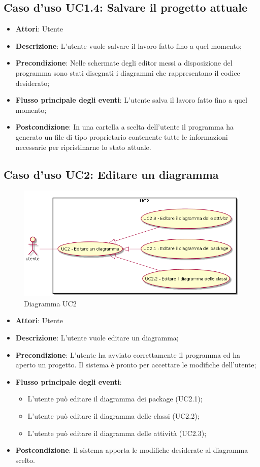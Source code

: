 \documentclass[../AnalisiDeiRequisiti.tex]{subfiles}
\begin{document}
	\subsection{Caso d'uso UC1.4: Salvare il progetto attuale}
	\begin{itemize}
		\item \textbf{Attori}: Utente
		\item \textbf{Descrizione}: L'utente vuole salvare il lavoro fatto fino a quel momento;
		\item \textbf{Precondizione}: Nelle schermate degli editor messi a disposizione del programma sono stati disegnati i diagrammi che rappresentano il codice desiderato;
		\item \textbf{Flusso principale degli eventi}: L'utente salva il lavoro fatto fino a quel momento;
		\item \textbf{Postcondizione}: In una cartella a scelta dell'utente il programma ha generato un file di tipo proprietario contenente tutte le informazioni necessarie per ripristinarne lo stato attuale.
	\end{itemize}
	\subsection{Caso d'uso UC2: Editare un diagramma}
		\begin{figure} [H]
			\centering
			\includegraphics[scale=0.45]{./Figures/UC2.png}
			\caption{Diagramma UC2}\label{}
		\end{figure}
	\begin{itemize}
		\item \textbf{Attori}: Utente
		\item \textbf{Descrizione}: L'utente vuole editare un diagramma;
		\item \textbf{Precondizione}: L'utente ha avviato correttamente il programma ed ha aperto un progetto. Il sistema è pronto per accettare le modifiche dell'utente;
		\item \textbf{Flusso principale degli eventi}: \begin{itemize}
			\item L'utente può editare il diagramma dei package (UC2.1);
			\item L'utente può editare il diagramma delle classi (UC2.2);
			\item L'utente può editare il diagramma delle attività (UC2.3);
		\end{itemize}
		\item \textbf{Postcondizione}: Il sistema apporta le modifiche desiderate al diagramma scelto.
	\end{itemize}
\end{document}
